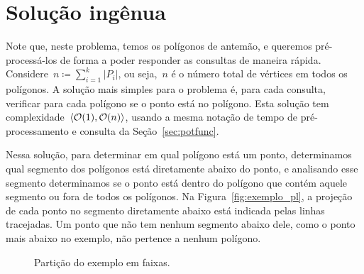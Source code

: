 \documentclass[main.tex]{subfiles}
\begin{document}
\section{Solução ingênua}

Note que, neste problema, temos os polígonos de antemão, e queremos pré-processá-los de forma a poder responder as consultas de maneira rápida. Considere~${n \coloneqq \sum\limits_{i = 1}^k{|P_i|}}$, ou seja,~$n$ é o número total de vértices em todos os polígonos. A solução mais simples para o problema é, para cada consulta, verificar para cada polígono se o ponto está no polígono. Esta solução tem complexidade~$\langle\mathcal{O}(1), \mathcal{O}(n)\rangle$, usando a mesma notação de tempo de pré-processamento e consulta da Seção~\ref{sec:potfunc}.

Nessa solução, para determinar em qual polígono está um ponto, determinamos qual segmento dos polígonos está diretamente abaixo do ponto, e analisando esse segmento determinamos se o ponto está dentro do polígono que contém aquele segmento ou fora de todos os polígonos. Na Figura~\ref{fig:exemplo_pl}, a projeção de cada ponto no segmento diretamente abaixo está indicada pelas linhas tracejadas. Um ponto que não tem nenhum segmento abaixo dele, como o ponto mais abaixo no exemplo, não pertence a nenhum polígono.

\begin{figure}
\centering
{}
\caption{Partição do exemplo em faixas.} \label{fig:slabs}
\end{figure}
\end{document}
